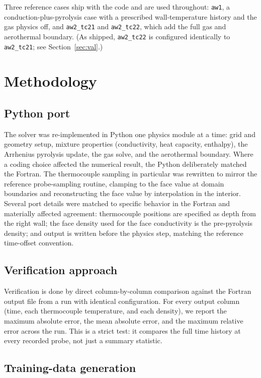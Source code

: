 \documentclass[11pt]{article}
\begin{document}
Three reference cases ship with the code and are used throughout: \texttt{aw1}, a
conduction-plus-pyrolysis case with a prescribed wall-temperature history and the
gas physics off, and \texttt{aw2\_tc21} and \texttt{aw2\_tc22}, which add the full
gas and aerothermal boundary. (As shipped, \texttt{aw2\_tc22} is configured
identically to \texttt{aw2\_tc21}; see Section~\ref{sec:val}.)

\section{Methodology}

\subsection{Python port}

The solver was re-implemented in Python one physics module at a time: grid and
geometry setup, mixture properties (conductivity, heat capacity, enthalpy), the
Arrhenius pyrolysis update, the gas solve, and the aerothermal boundary. Where a
coding choice affected the numerical result, the Python deliberately matched the
Fortran. The thermocouple sampling in particular was rewritten to mirror the
reference probe-sampling routine, clamping to the face value at domain boundaries
and reconstructing the face value by interpolation in the interior. Several port
details were matched to specific behavior in the Fortran and materially affected
agreement: thermocouple positions are specified as depth from the right wall; the
face density used for the face conductivity is the pre-pyrolysis density; and
output is written before the physics step, matching the reference time-offset
convention.

\subsection{Verification approach}

Verification is done by direct column-by-column comparison against the Fortran
output file from a run with identical configuration. For every output column
(time, each thermocouple temperature, and each density), we report the maximum
absolute error, the mean absolute error, and the maximum relative error across the
run. This is a strict test: it compares the full time history at every recorded
probe, not just a summary statistic.

\subsection{Training-data generation}
\end{document}
